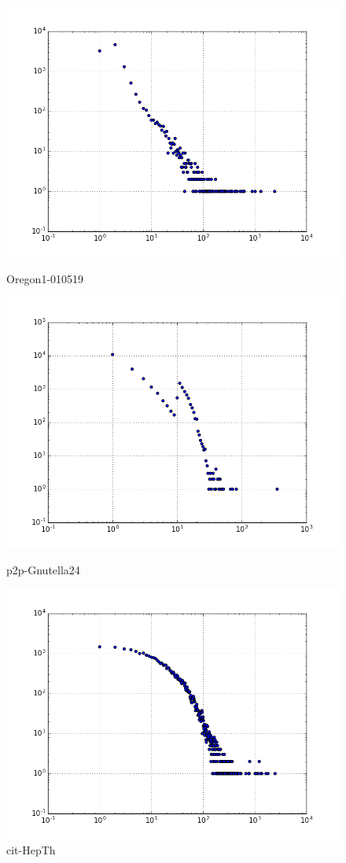 \begin{figure}[H]
  \includegraphics[width=\linewidth]{img/oregon-010519/degree_dist.png}
  \caption*{Oregon1-010519}
\endminipage\hfill
{}
  \includegraphics[width=\linewidth]{img/p2p-Gnutella24/degree_dist.png}
  \caption*{p2p-Gnutella24}
\endminipage\hfill
{}
  \includegraphics[width=\linewidth]{img/cit-HepTh/degree_dist.png}
  \caption*{cit-HepTh}
\endminipage
\end{figure}


